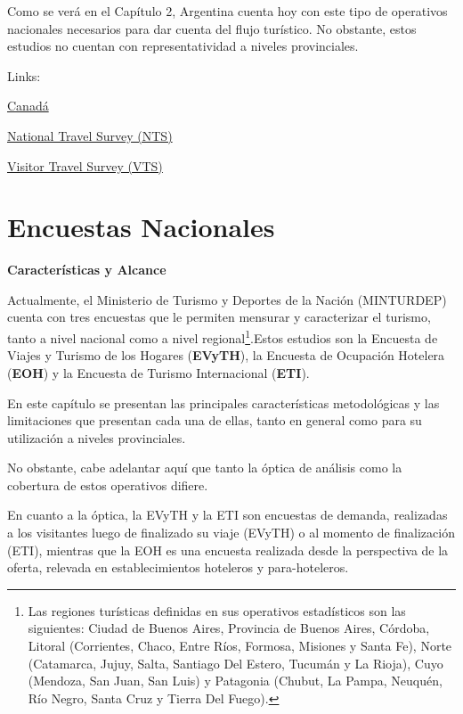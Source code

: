 \documentclass[
]{book}
\begin{document}
Como se verá en el Capítulo 2, Argentina cuenta hoy con este tipo de operativos nacionales necesarios para dar cuenta del flujo turístico. No obstante, estos estudios no cuentan con representatividad a niveles provinciales.

Links:

\href{https://www150.statcan.gc.ca/n1/en/subjects/travel_and_tourism}{Canadá}

\href{https://www23.statcan.gc.ca/imdb/p2SV.pl?Function=getSurvey\&SDDS=5232}{National Travel Survey (NTS)}

\href{https://www23.statcan.gc.ca/imdb/p2SV.pl?Function=getSurvey\&SDDS=5261}{Visitor Travel Survey (VTS)}

\hypertarget{encuestas-nacionales}{%
\chapter{\texorpdfstring{\textbf{Encuestas Nacionales}}{Encuestas Nacionales}}\label{encuestas-nacionales}}

\textbf{Características y Alcance}

Actualmente, el Ministerio de Turismo y Deportes de la Nación (MINTURDEP) cuenta con tres encuestas que le permiten mensurar y caracterizar el turismo, tanto a nivel nacional como a nivel regional\footnote{Las regiones turísticas definidas en sus operativos estadísticos son las siguientes: Ciudad de Buenos Aires, Provincia de Buenos Aires, Córdoba, Litoral (Corrientes, Chaco, Entre Ríos, Formosa, Misiones y Santa Fe), Norte (Catamarca, Jujuy, Salta, Santiago Del Estero, Tucumán y La Rioja), Cuyo (Mendoza, San Juan, San Luis) y Patagonia (Chubut, La Pampa, Neuquén, Río Negro, Santa Cruz y Tierra Del Fuego).}.Estos estudios son la Encuesta de Viajes y Turismo de los Hogares (\textbf{EVyTH}), la Encuesta de Ocupación Hotelera (\textbf{EOH}) y la Encuesta de Turismo Internacional (\textbf{ETI}).

En este capítulo se presentan las principales características metodológicas y las limitaciones que presentan cada una de ellas, tanto en general como para su utilización a niveles provinciales.

No obstante, cabe adelantar aquí que tanto la óptica de análisis como la cobertura de estos operativos difiere.

En cuanto a la óptica, la EVyTH y la ETI son encuestas de demanda, realizadas a los visitantes luego de finalizado su viaje (EVyTH) o al momento de finalización (ETI), mientras que la EOH es una encuesta realizada desde la perspectiva de la oferta, relevada en establecimientos hoteleros y para-hoteleros.
\end{document}
